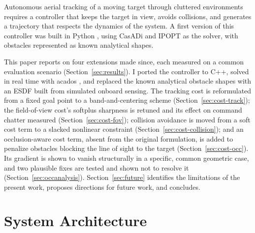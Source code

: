 \documentclass[conference]{IEEEtran}
\begin{document}
Autonomous aerial tracking of a moving target through cluttered environments requires a controller that keeps the target in view, avoids collisions, and generates a trajectory that respects the dynamics of the system. A first version of this controller was built in Python \cite{pinto_thesis}, using CasADi and IPOPT as the solver, with obstacles represented as known analytical shapes.

This paper reports on four extensions made since, each measured on a common evaluation scenario (Section~\ref{sec:results}). I ported the controller to C++, solved in real time with acados \cite{acados}, and replaced the known analytical obstacle shapes with an ESDF built from simulated onboard sensing. The tracking cost is reformulated from a fixed goal point to a band-and-centering scheme (Section~\ref{sec:cost-track}); the field-of-view cost's softplus sharpness is retuned and its effect on command chatter measured (Section~\ref{sec:cost-fov}); collision avoidance is moved from a soft cost term to a slacked nonlinear constraint (Section~\ref{sec:cost-collision}); and an occlusion-aware cost term, absent from the original formulation, is added to penalize obstacles blocking the line of sight to the target (Section~\ref{sec:cost-occ}). Its gradient is shown to vanish structurally in a specific, common geometric case, and two plausible fixes are tested and shown not to resolve it (Section~\ref{sec:occanalysis}). Section~\ref{sec:future} identifies the limitations of the present work, proposes directions for future work, and concludes.

\section{System Architecture}
\label{sec:arch}
\end{document}
